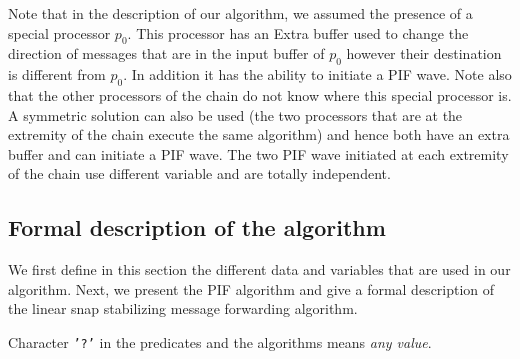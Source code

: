 \documentclass{llncs}
\begin{document}
Note that in the description of our algorithm, we assumed the presence of a special processor $p_{0}$. This processor has an Extra buffer used to change the direction of messages that are in the input buffer of $p_{0}$ however their destination is different from $p_{0}$. In addition it has the ability to initiate a PIF wave. Note also that the other processors of the chain do not know where this special processor is. A symmetric solution can also be used (the two processors that are at the extremity of the chain execute the same algorithm) and hence both have an extra buffer and can initiate a PIF wave. The two PIF wave initiated at each extremity of the chain use different variable and are totally independent. 







\subsection{Formal description of the algorithm}




We first define in this section the different data and variables that are used in our algorithm. Next, we present the
PIF algorithm and give a formal description of the linear snap stabilizing message forwarding algorithm.

Character {\tt '?'} in the predicates and the algorithms means {\em any value}.
\end{document}
